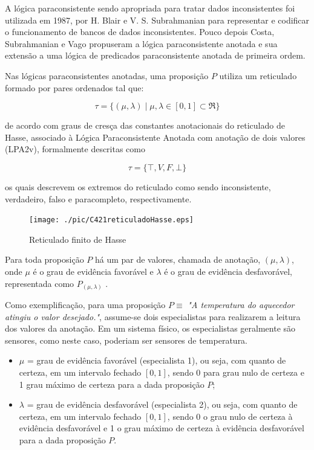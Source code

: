 A lógica paraconsistente sendo apropriada para tratar dados inconsistentes foi utilizada em 1987, por H. Blair e V. S. Subrahmanian para representar e codificar o funcionamento de bancos de dados inconsistentes. Pouco depois Costa, Subrahmanian e Vago propuseram a lógica paraconsistente anotada e sua extensão a uma lógica de predicados paraconsistente anotada de primeira ordem. 

Nas lógicas paraconsistentes anotadas, uma proposição $P$ utiliza um reticulado formado por pares ordenados tal que: 

\begin{center}
\begin{equation}
\tau = \{ ( \mu , \lambda ) \mid \mu ,\lambda \in [0,1] \subset \Re \}
\end{equation}
\end{center}

de acordo com graus de cresça das constantes anotacionais do reticulado de Hasse, associado à Lógica Paraconsistente Anotada com anotação de dois valores (LPA2v), formalmente descritas como 

\begin{center}
\begin{equation}
  \tau = \{ \top , V, F, \bot \}
\end{equation}
\end{center}

os quais descrevem os extremos do reticulado como sendo inconsistente, verdadeiro, falso e paracompleto, respectivamente. 

\begin{figure}[!htb]
\center\texttt{[image: ./pic/C421reticuladoHasse.eps]}
\caption{Reticulado finito de Hasse}
\label{fig:reticuladoHasse}
\end{figure}

Para toda proposição $P$ há um par de valores, chamada de anotação, $(\mu , \lambda )$, onde $\mu$ é o grau de evidência favorável e $\lambda $ é o grau de evidência desfavorável, representada como  $P_{( \mu , \lambda )}$ .

Como exemplificação, para uma proposição $P \equiv$ \emph{"A temperatura do aquecedor atingiu o valor desejado."}, assume-se dois especialistas para realizarem a leitura dos valores da anotação. Em um sistema físico, os especialistas geralmente são sensores, como neste caso, poderiam ser sensores de temperatura.

\begin{itemize}
\item 
$\mu$ = grau de evidência favorável (especialista 1), ou seja, com quanto de certeza, em um intervalo fechado $[0,1]$, sendo 0 para grau nulo de certeza e 1 grau máximo de certeza para a dada proposição $P$;

\item
$\lambda$ = grau de evidência desfavorável (especialista 2), ou seja, com quanto de certeza, em um intervalo fechado $[0,1]$, sendo 0 o grau nulo de certeza à evidência desfavorável e 1 o grau máximo de certeza à evidência desfavorável para a dada proposição $P$.

\end{itemize}


